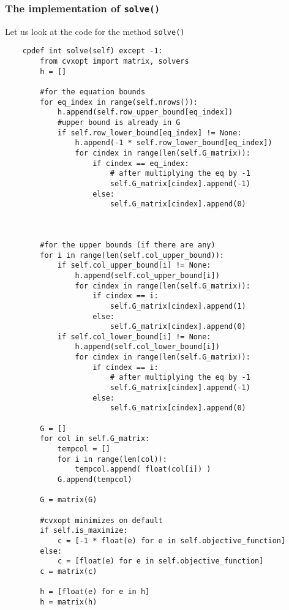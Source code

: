 \subsubsection{The implementation of \texttt{solve()}}
\label{impsolve}
Let us look at the code for the method \texttt{solve()}
\begin{verbatim}
    cpdef int solve(self) except -1:
        from cvxopt import matrix, solvers
        h = []

        #for the equation bounds
        for eq_index in range(self.nrows()):
            h.append(self.row_upper_bound[eq_index])
            #upper bound is already in G
            if self.row_lower_bound[eq_index] != None:
                h.append(-1 * self.row_lower_bound[eq_index])
                for cindex in range(len(self.G_matrix)):
                    if cindex == eq_index:
                        # after multiplying the eq by -1
                        self.G_matrix[cindex].append(-1) 
                    else:
                        self.G_matrix[cindex].append(0)



        #for the upper bounds (if there are any)
        for i in range(len(self.col_upper_bound)):
            if self.col_upper_bound[i] != None:
                h.append(self.col_upper_bound[i])
                for cindex in range(len(self.G_matrix)):
                    if cindex == i:
                        self.G_matrix[cindex].append(1)
                    else:
                        self.G_matrix[cindex].append(0)
            if self.col_lower_bound[i] != None:
                h.append(self.col_lower_bound[i])
                for cindex in range(len(self.G_matrix)):
                    if cindex == i:
                        # after multiplying the eq by -1
                        self.G_matrix[cindex].append(-1) 
                    else:
                        self.G_matrix[cindex].append(0)

        G = []
        for col in self.G_matrix:
            tempcol = []
            for i in range(len(col)):
                tempcol.append( float(col[i]) )
            G.append(tempcol)

        G = matrix(G)

        #cvxopt minimizes on default
        if self.is_maximize:
            c = [-1 * float(e) for e in self.objective_function]
        else:
            c = [float(e) for e in self.objective_function]
        c = matrix(c)

        h = [float(e) for e in h]
        h = matrix(h)


\end{verbatim}
